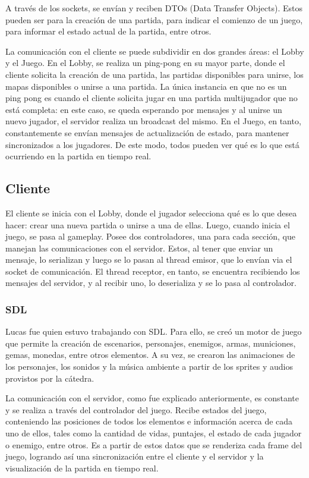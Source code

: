 \documentclass[titlepage,a4paper]{article}
\begin{document}
A través de los sockets, se envían y reciben DTOs (Data Transfer Objects). Estos pueden ser para la creación de una partida, para indicar el comienzo de un juego, para informar el estado actual de la partida, entre otros. 

La comunicación con el cliente se puede subdividir en dos grandes áreas: el Lobby y el Juego. En el Lobby, se realiza un ping-pong en su mayor parte, donde el cliente solicita la creación de una partida, las partidas disponibles para unirse, los mapas disponibles o unirse a una partida. La única instancia en que no es un ping pong es cuando el cliente solicita jugar en una partida multijugador que no está completa: en este caso, se queda esperando por mensajes y al unirse un nuevo jugador, el servidor realiza un broadcast del mismo. En el Juego, en tanto, constantemente se envían mensajes de actualización de estado, para mantener sincronizados a los jugadores. De este modo, todos pueden ver qué es lo que está ocurriendo en la partida en tiempo real.

\subsection{Cliente}
El cliente se inicia con el Lobby, donde el jugador selecciona qué es lo que desea hacer: crear una nueva partida o unirse a una de ellas. Luego, cuando inicia el juego, se pasa al gameplay. Posee dos controladores, una para cada sección, que manejan las comunicaciones con el servidor. Estos, al tener que enviar un mensaje, lo serializan y luego se lo pasan al thread emisor, que lo envían via el socket de comunicación. El thread receptor, en tanto, se encuentra recibiendo los mensajes del servidor, y al recibir uno, lo deserializa y se lo pasa al controlador.

\subsubsection{SDL}
Lucas fue quien estuvo trabajando con SDL. Para ello, se creó un motor de juego que permite la creación de escenarios, personajes, enemigos, armas, municiones, gemas, monedas, entre otros elementos. A su vez, se crearon las animaciones de los personajes, los sonidos y la música ambiente a partir de los sprites y audios provistos por la cátedra. 

La comunicación con el servidor, como fue explicado anteriormente, es constante y se realiza a través del controlador del juego. Recibe estados del juego, conteniendo las posiciones de todos los elementos e información acerca de cada uno de ellos, tales como la cantidad de vidas, puntajes, el estado de cada jugador o enemigo, entre otros. Es a partir de estos datos que se renderiza cada frame del juego, logrando así una sincronización entre el cliente y el servidor y la visualización de la partida en tiempo real.
\end{document}
